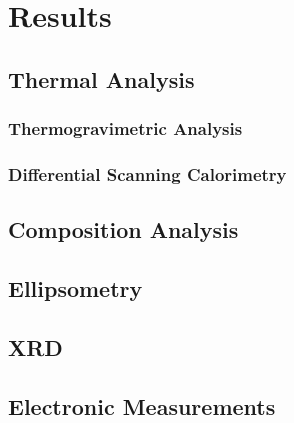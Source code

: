 \chapter{Results}
\label{ch:results}
\thispagestyle{empty}



\section{Thermal Analysis}
\label{chap:Results-Thermal}



\subsection{Thermogravimetric Analysis}



\subsection{Differential Scanning Calorimetry}


\section{Composition Analysis}
\label{chap:Results-Composition}

\lipsum


\section{Ellipsometry}
\label{chap:Results-Ellipsometry}

\lipsum


\section{XRD}
\label{chap:Results-XRD}




\section{Electronic Measurements}
\label{chap:Results-Electronic}





